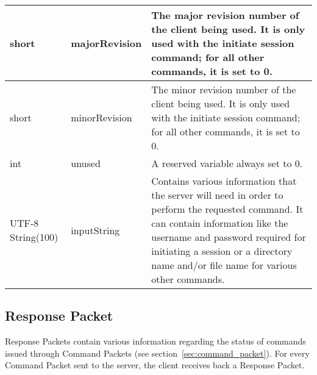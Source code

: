 \documentclass[10pt]{article}
\newcommand{\tblspc}{\rule{0pt}{3ex}}
\begin{document}
\begin{longtable}{|p{}|l|p{}|}
\hline
\tblspc short & majorRevision & The major revision number of the client being used. It is only used with the initiate session command; for all other commands, it is set to 0. \\
\hline
\tblspc short & minorRevision & The minor revision number of the client being used. It is only used with the initiate session command; for all other commands, it is set to 0. \\
\hline
\tblspc int & unused & A reserved variable always set to 0. \\
\hline
\tblspc UTF-8 String(100) & inputString & Contains various information that the server will need in order to perform the requested command. It can contain information like the username and password required for initiating a session or a directory name and/or file name for various other commands. \\
\hline
\end{longtable}

\subsection{Response Packet}
\label{sec:response_packet}
Response Packets contain various information regarding the status of commands issued through Command Packets (see section~\ref{sec:command_packet}). For every Command Packet sent to the server, the client receives back a Response Packet.
\end{document}
